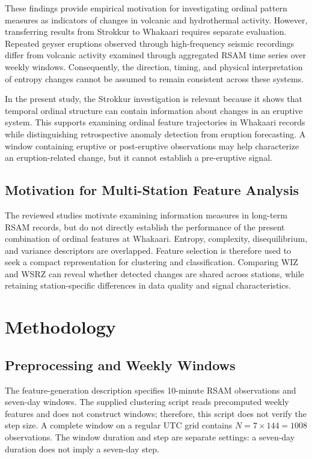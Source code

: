 \documentclass[11pt,a4paper]{article}
\begin{document}
These findings provide empirical motivation for investigating ordinal pattern measures as indicators of changes in volcanic and hydrothermal activity. However, transferring results from Strokkur to Whakaari requires separate evaluation. Repeated geyser eruptions observed through high-frequency seismic recordings differ from volcanic activity examined through aggregated RSAM time series over weekly windows. Consequently, the direction, timing, and physical interpretation of entropy changes cannot be assumed to remain consistent across these systems.

In the present study, the Strokkur investigation is relevant because it shows that temporal ordinal structure can contain information about changes in an eruptive system. This supports examining ordinal feature trajectories in Whakaari records while distinguishing retrospective anomaly detection from eruption forecasting. A window containing eruptive or post-eruptive observations may help characterize an eruption-related change, but it cannot establish a pre-eruptive signal.

\subsection{Motivation for Multi-Station Feature Analysis}
The reviewed studies motivate examining information measures in long-term RSAM records, but do not directly establish the performance of the present combination of ordinal features at Whakaari. Entropy, complexity, disequilibrium, and variance descriptors are overlapped. Feature selection is therefore used to seek a compact representation for clustering and classification. Comparing WIZ and WSRZ can reveal whether detected changes are shared across stations, while retaining station-specific differences in data quality and signal characteristics.

\section{Methodology} 

\subsection{Preprocessing and Weekly Windows} 

The feature-generation description specifies 10-minute RSAM observations and seven-day windows. The supplied clustering script reads precomputed weekly features and does not construct windows; therefore, this script does not verify the step size. A complete window on a regular UTC grid contains $N=7\times144=1008$ observations. The window duration and step are separate settings: a seven-day duration does not imply a seven-day step. 
\end{document}
